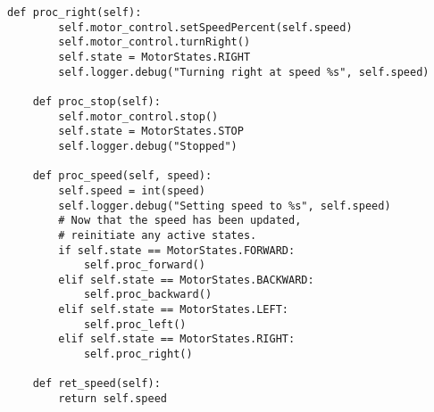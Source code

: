 \begin{lstlisting}[style=custompython]
    def proc_right(self):
        self.motor_control.setSpeedPercent(self.speed)
        self.motor_control.turnRight()
        self.state = MotorStates.RIGHT
        self.logger.debug("Turning right at speed %s", self.speed)

    def proc_stop(self):
        self.motor_control.stop()
        self.state = MotorStates.STOP
        self.logger.debug("Stopped")

    def proc_speed(self, speed):
        self.speed = int(speed)
        self.logger.debug("Setting speed to %s", self.speed)
        # Now that the speed has been updated,
        # reinitiate any active states.
        if self.state == MotorStates.FORWARD:
            self.proc_forward()
        elif self.state == MotorStates.BACKWARD:
            self.proc_backward()
        elif self.state == MotorStates.LEFT:
            self.proc_left()
        elif self.state == MotorStates.RIGHT:
            self.proc_right()

    def ret_speed(self):
        return self.speed

\end{lstlisting}
